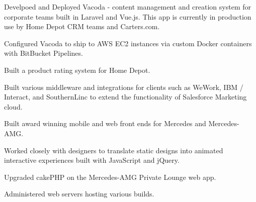 \documentclass[]{pb-resume-openfonts}
\begin{document}
\begin{minipage}[t]{0.66\textwidth}
\begin{tightemize}
\item Develpoed and Deployed Vacoda - content management and creation system for corporate teams built in Laravel and Vue.js. This app is currently in production use by Home Depot CRM teams and Carters.com.
\item Configured Vacoda to ship to AWS EC2 instances via custom Docker containers with BitBucket Pipelines.
\item Built a product rating system for Home Depot.
\item Built various middleware and integrations for clients such as WeWork, IBM / Interact, and SouthernLinc to extend the functionality of Salesforce Marketing cloud.
\end{tightemize}  
\sectionsep

\vspace{\topsep} %
\begin{tightemize}
\item Built award winning mobile and web front ends for Mercedes and Mercedes-AMG.
\item Worked closely with designers to translate static designs into animated interactive experiences built with JavaScript and jQuery.
\item Upgraded cakePHP on the Mercedes-AMG Private Lounge web app. 
\item Administered web servers hosting various builds.
\end{tightemize}
\sectionsep

\end{minipage} 
\end{document}
